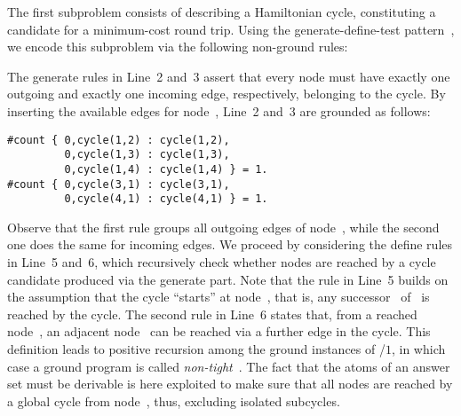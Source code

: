 The first subproblem consists of describing a Hamiltonian cycle,
constituting a candidate for a minimum-cost round trip.
Using the generate-define-test pattern~\cite{lifschitz02a},
we encode this subproblem via the following non-ground rules:
%

%
The generate rules in Line~2 and~3 assert that every node must have
exactly one outgoing and exactly one incoming edge, respectively,
belonging to the cycle.
By inserting the available edges for node~,
Line~2 and~3 are grounded as follows:%
%
\begin{lstlisting}[numbers=none]
#count { 0,cycle(1,2) : cycle(1,2),
         0,cycle(1,3) : cycle(1,3),
         0,cycle(1,4) : cycle(1,4) } = 1.
#count { 0,cycle(3,1) : cycle(3,1), 
         0,cycle(4,1) : cycle(4,1) } = 1.
\end{lstlisting}
%
Observe that the first rule groups all outgoing edges of node~,
while the second one does the same for incoming edges.
We proceed by considering the define rules in Line~5 and~6,
which recursively check whether nodes are reached by a cycle candidate
produced via the generate part.
Note that the rule in Line~5 builds on the assumption that the cycle
``starts'' at node~, that is,
any successor~ of~ is reached by the cycle.
The second rule in Line~6 states that, from a reached node~,
an adjacent node~ can be reached via a further edge in the cycle.
This definition leads to positive recursion
among the ground instances of /$1$,
in which case a ground program is called \emph{non-tight}~\cite{erdlif03a,fages94a}.
The fact that the atoms of an answer set must be derivable is here exploited
to make sure that all nodes are reached
by a global cycle from node~, thus, excluding isolated subcycles.
